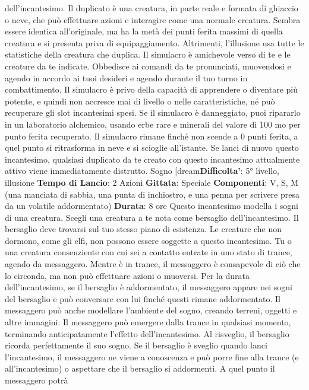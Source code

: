 \begin{multicols}{2}
dell’incantesimo. Il duplicato è una creatura, in parte
reale e formata di ghiaccio o neve, che può effettuare
azioni e interagire come una normale creatura. Sembra
essere identica all’originale, ma ha la metà dei punti
ferita massimi di quella creatura e si presenta priva di
equipaggiamento. Altrimenti, l’illusione usa tutte le
statistiche della creatura che duplica.
Il simulacro è amichevole verso di te e le creature da te
indicate. Obbedisce ai comandi da te pronunciati,
muovendosi e agendo in accordo ai tuoi desideri e
agendo durante il tuo turno in combattimento. Il
simulacro è privo della capacità di apprendere o
diventare più potente, e quindi non accresce mai di
livello o nelle caratteristiche, né può recuperare gli slot
incantesimi spesi.
Se il simulacro è danneggiato, puoi ripararlo in un
laboratorio alchemico, usando erbe rare e minerali del
valore di 100 mo per punto ferita recuperato. Il
simulacro rimane finché non scende a 0 punti ferita, a
quel punto si ritrasforma in neve e si scioglie all’istante.
Se lanci di nuovo questo incantesimo, qualsiasi
duplicato da te creato con questo incantesimo
attualmente attivo viene immediatamente distrutto.
Sogno
[dream\textbf{Difficolta'}:
5° livello, illusione
\textbf{Tempo di Lancio}: 2 Azioni
\textbf{Gittata}: Speciale
\textbf{Componenti}: V, S, M (una manciata di sabbia, una
punta di inchiostro, e una penna per scrivere presa da
un volatile addormentato)
\textbf{Durata}: 8 ore
Questo incantesimo modella i sogni di una creatura.
Scegli una creatura a te nota come bersaglio
dell’incantesimo. Il bersaglio deve trovarsi sul tuo
stesso piano di esistenza. Le creature che non
dormono, come gli elfi, non possono essere soggette a
questo incantesimo. Tu o una creatura consenziente
con cui sei a contatto entrate in uno stato di trance,
agendo da messaggero. Mentre è in trance, il
messaggero è consapevole di ciò che lo circonda, ma
non può effettuare azioni o muoversi.
Per la durata dell’incantesimo, se il bersaglio è
addormentato, il messaggero appare nei sogni del
bersaglio e può conversare con lui finché questi rimane
addormentato. Il messaggero può anche modellare
l’ambiente del sogno, creando terreni, oggetti e altre
immagini. Il messaggero può emergere dalla trance in
qualsiasi momento, terminando anticipatamente l’effetto
dell’incantesimo. Al risveglio, il bersaglio ricorda
perfettamente il suo sogno. Se il bersaglio è sveglio
quando lanci l’incantesimo, il messaggero ne viene a
conoscenza e può porre fine alla trance (e
all’incantesimo) o aspettare che il bersaglio si
addormenti. A quel punto il messaggero potrà

\end{multicols}
